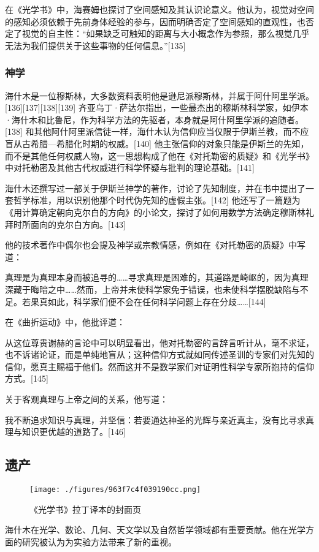 在《光学书》中，海赛姆也探讨了空间感知及其认识论意义。他认为，视觉对空间的感知必须依赖于先前身体经验的参与，因而明确否定了空间感知的直观性，也否定了视觉的自主性：“如果缺乏可触知的距离与大小概念作为参照，那么视觉几乎无法为我们提供关于这些事物的任何信息。”[135]
\subsubsection{神学}
海什木是一位穆斯林，大多数资料表明他是逊尼派穆斯林，并属于阿什阿里学派。[136][137][138][139] 齐亚乌丁·萨达尔指出，一些最杰出的穆斯林科学家，如伊本·海什木和比鲁尼，作为科学方法的先驱者，本身就是阿什阿里学派的追随者。[138] 和其他阿什阿里派信徒一样，海什木认为信仰应当仅限于伊斯兰教，而不应盲从古希腊—希腊化时期的权威。[140] 他主张信仰的对象只能是伊斯兰的先知，而不是其他任何权威人物，这一思想构成了他在《对托勒密的质疑》和《光学书》中对托勒密及其他古代权威进行科学怀疑与批判的理论基础。[141]

海什木还撰写过一部关于伊斯兰神学的著作，讨论了先知制度，并在书中提出了一套哲学标准，用以识别他那个时代伪先知的虚假主张。[142] 他还写了一篇题为《用计算确定朝向克尔白的方向》的小论文，探讨了如何用数学方法确定穆斯林礼拜时所面向的克尔白方向。[143]

他的技术著作中偶尔也会提及神学或宗教情感，例如在《对托勒密的质疑》中写道：

真理是为真理本身而被追寻的……寻求真理是困难的，其道路是崎岖的，因为真理深藏于晦暗之中……然而，上帝并未使科学家免于错误，也未使科学摆脱缺陷与不足。若果真如此，科学家们便不会在任何科学问题上存在分歧……[144]

在《曲折运动》中，他批评道：

从这位尊贵谢赫的言论中可以明显看出，他对托勒密的言辞言听计从，毫不求证，也不诉诸论证，而是单纯地盲从；这种信仰方式就如同传述圣训的专家们对先知的信仰，愿真主赐福于他们。然而这并不是数学家们对证明性科学专家所抱持的信仰方式。[145]

关于客观真理与上帝之间的关系，他写道：

我不断追求知识与真理，并坚信：若要通达神圣的光辉与亲近真主，没有比寻求真理与知识更优越的道路了。[146]
\subsection{遗产}
\begin{figure}[ht]
\centering
\texttt{[image: ./figures/963f7c4f039190cc.png]}
\caption{《光学书》拉丁译本的封面页} \label{fig_YBH_5}
\end{figure}
海什木在光学、数论、几何、天文学以及自然哲学领域都有重要贡献。他在光学方面的研究被认为为实验方法带来了新的重视。

